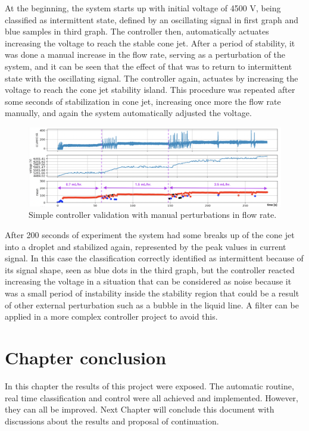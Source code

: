     At the beginning, the system starts up with initial voltage of 4500 V, being classified as intermittent state, defined by an oscillating signal in first graph and blue samples in third graph. 
    The controller then, automatically actuates increasing the voltage to reach the stable cone jet. 
    After a period of stability, it was done a manual increase in the flow rate, serving as a perturbation of the system, and it can be seen that the effect of that was to return to intermittent state with the oscillating signal. 
    The controller again, actuates by increasing the voltage to reach the cone jet stability island. 
    This procedure was repeated after some seconds of stabilization in cone jet, increasing once more the flow rate manually, and again the system automatically adjusted the voltage.
    
    \begin{figure}[H]
            \center
            \includegraphics[width=16cm]{Figuras/19:03/control_first_results.png}
            \caption{Simple controller validation with manual perturbations in flow rate.}
            \label{fig:control_results}
        \end{figure}

    After 200 seconds of experiment the system had some breaks up of the cone jet into a droplet and stabilized again, represented by the peak values in current signal. In this case the classification correctly identified as intermittent because of its signal shape, seen as blue dots in the third graph, but the controller reacted increasing the voltage in a situation that can be considered as noise because it was a small period of instability inside the stability region that could be a result of other external perturbation such as a bubble in the liquid line. A filter can be applied in a more complex controller project to avoid this.
    


\section{Chapter conclusion}

In this chapter the results of this project were exposed. The automatic routine, real time classification and control were all achieved and implemented. However, they can all be improved. Next Chapter will conclude this document with discussions about the results and proposal of continuation.


\clearpage